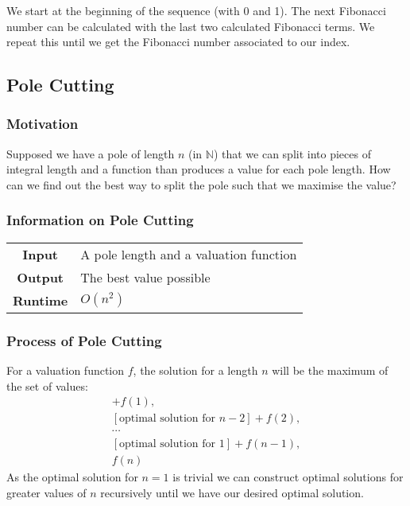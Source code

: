 \documentclass[a4paper, 12pt, twoside]{article}
\begin{document}
We start at the beginning of the sequence (with 0 and 1). The next 
Fibonacci number can be calculated with the last two calculated
Fibonacci terms. We repeat this until we get the Fibonacci number
associated to our index.

\newpage

\subsection{Pole Cutting}

\subsubsection{Motivation}

Supposed we have a pole of length $n$ (in $\mathbb{N}$) that we 
can split into pieces of integral length and a function
than produces a value for each pole length. How can we find out
the best way to split the pole such that we maximise the value?

\subsubsection{Information on Pole Cutting}

\begin{center}
      \begin{tabular}{ || c | p{8.5cm} || }
            \hline
                  \textbf{Input} & A pole length and a valuation
                        function \\
                  \textbf{Output} & The best value possible \\
            \hline\hline
                  \textbf{Runtime} & $O(n^2)$ \\
            \hline
      \end{tabular}
\end{center}

\subsubsection{Process of Pole Cutting}

For a valuation function $f$, the solution for a length $n$ will 
be the maximum of the set of values:
\begin{gather*}
      [\text{optimal solution for } n - 1] + f(1), \\
      [\text{optimal solution for } n - 2] + f(2), \\
      \cdots \\
      [\text{optimal solution for } 1] + f(n - 1), \\
      f(n)
\end{gather*}
As the optimal solution for $n = 1$ is trivial we can construct 
optimal solutions for greater values of $n$ recursively
until we have our desired optimal solution.
\end{document}
